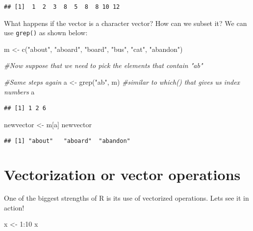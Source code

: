 \documentclass[
]{book}
\newenvironment{Shaded}{\begin{snugshade}}{\end{snugshade}}
\newcommand{\CommentTok}[1]{\textcolor[rgb]{0.56,0.35,0.01}{\textit{#1}}}
\newcommand{\DecValTok}[1]{\textcolor[rgb]{0.00,0.00,0.81}{#1}}
\newcommand{\FunctionTok}[1]{\textcolor[rgb]{0.00,0.00,0.00}{#1}}
\newcommand{\NormalTok}[1]{#1}
\newcommand{\OtherTok}[1]{\textcolor[rgb]{0.56,0.35,0.01}{#1}}
\newcommand{\SpecialCharTok}[1]{\textcolor[rgb]{0.00,0.00,0.00}{#1}}
\newcommand{\StringTok}[1]{\textcolor[rgb]{0.31,0.60,0.02}{#1}}
\begin{document}
\begin{verbatim}
## [1]  1  2  3  8  5  8  8 10 12
\end{verbatim}

What happens if the vector is a character vector? How can we subset it? We can use \texttt{grep()} as shown below:

\begin{Shaded}
\begin{Highlighting}[]
\NormalTok{m }\OtherTok{\textless{}{-}} \FunctionTok{c}\NormalTok{(}\StringTok{"about"}\NormalTok{, }\StringTok{"aboard"}\NormalTok{, }\StringTok{"board"}\NormalTok{, }\StringTok{"bus"}\NormalTok{, }\StringTok{"cat"}\NormalTok{, }\StringTok{"abandon"}\NormalTok{)}

\CommentTok{\#Now suppose that we need to pick the elements that contain "ab"}

\CommentTok{\#Same steps again}
\NormalTok{a }\OtherTok{\textless{}{-}} \FunctionTok{grep}\NormalTok{(}\StringTok{"ab"}\NormalTok{, m) }\CommentTok{\#similar to which() that gives us index numbers}
\NormalTok{a}
\end{Highlighting}
\end{Shaded}

\begin{verbatim}
## [1] 1 2 6
\end{verbatim}

\begin{Shaded}
\begin{Highlighting}[]
\NormalTok{newvector }\OtherTok{\textless{}{-}}\NormalTok{ m[a]}
\NormalTok{newvector}
\end{Highlighting}
\end{Shaded}

\begin{verbatim}
## [1] "about"   "aboard"  "abandon"
\end{verbatim}

\hypertarget{vectorization-or-vector-operations}{%
\section{Vectorization or vector operations}\label{vectorization-or-vector-operations}}

One of the biggest strengths of R is its use of vectorized operations. Lets see it in action!

\begin{Shaded}
\begin{Highlighting}[]
\NormalTok{x }\OtherTok{\textless{}{-}} \DecValTok{1}\SpecialCharTok{:}\DecValTok{10}
\NormalTok{x}
\end{Highlighting}
\end{Shaded}
\end{document}
